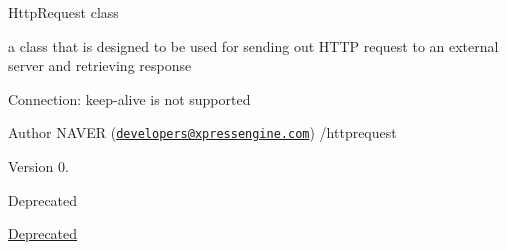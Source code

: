 \begin{DoxyItemize}
\item Http\+Request class
\item a class that is designed to be used for sending out H\+T\+T\+P request to an external server and retrieving response
\item Connection\+: keep-\/alive is not supported \begin{DoxyAuthor}{Author}
N\+A\+V\+E\+R (\href{mailto:developers@xpressengine.com}{\tt developers@xpressengine.\+com}) /httprequest 
\end{DoxyAuthor}
\begin{DoxyVersion}{Version}
0. 
\end{DoxyVersion}
\begin{DoxyRefDesc}{Deprecated}
\item[\hyperlink{deprecated__deprecated000009}{Deprecated}]\end{DoxyRefDesc}


\end{DoxyItemize}
